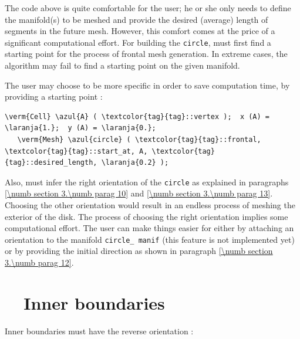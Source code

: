 The code above is quite comfortable for the user; he or she only needs to define
the manifold(s) to be meshed and provide the desired (average) length of segments
in the future mesh.
However, this comfort comes at the price of a significant computational effort.
For building the {\small\tt circle}, {\ManiFEM} must first find a starting point for the process
of frontal mesh generation.
In extreme cases, the algorithm may fail to find a starting point on the given manifold.

The user may choose to be more specific in order to save computation time,
by providing a starting point :

\begin{Verbatim}[commandchars=\\\{\},formatcom=\small\tt,
   baselinestretch=0.94,framesep=2mm                      ]
   \verm{Cell} \azul{A} ( \textcolor{tag}{tag}::vertex );  x (A) = \laranja{1.};  y (A) = \laranja{0.};
   \verm{Mesh} \azul{circle} ( \textcolor{tag}{tag}::frontal, \textcolor{tag}{tag}::start_at, A, \textcolor{tag}{tag}::desired_length, \laranja{0.2} );
\end{Verbatim}

Also, {\maniFEM} must infer the right orientation of the {\small\tt circle}
as explained in paragraphs \ref{\numb section 3.\numb parag 10} and
\ref{\numb section 3.\numb parag 13}.
Choosing the other orientation would result in an endless process of meshing the exterior of
the disk.
The process of choosing the right orientation implies some computational effort.
The user can make things easier for {\maniFEM} either by attaching an orientation
to the manifold {\small\tt circle\_\,manif} (this feature is not implemented yet) or
by providing the initial direction as shown in paragraph \ref{\numb section 3.\numb parag 12}.


\section{~~Inner boundaries}\label{\numb section 3.\numb parag 3}

Inner boundaries must have the reverse orientation :


